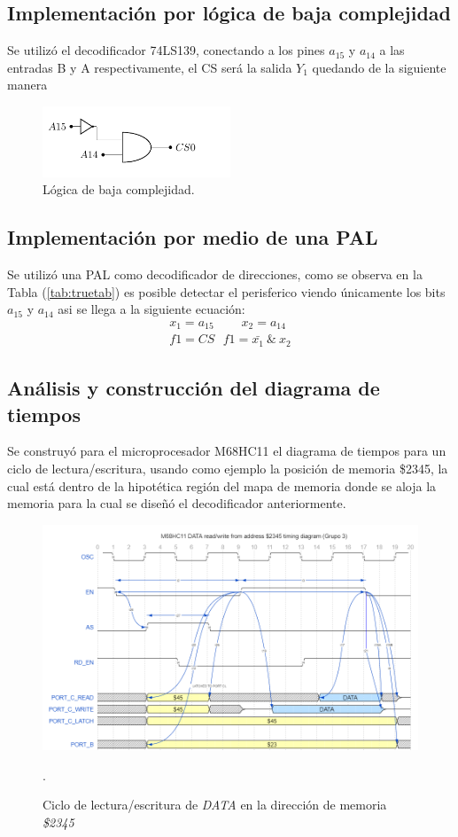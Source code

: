 \subsection{Implementación por lógica de baja complejidad}
Se utilizó el decodificador 74LS139, conectando a los pines $a_{15}$ y $a_{14}$ a las entradas B y A respectivamente, el CS será la salida $Y_1$ quedando de la siguiente manera
\begin{figure}[H]
  \centering
  \includegraphics[width=0.5\textwidth,page = 2]{ImagenesEjercicio1/Circuits.pdf}
  \caption{Lógica de baja complejidad.}
  \label{fig:circdec}
\end{figure}
\subsection{Implementación por medio de una PAL}
Se utilizó una PAL como decodificador de direcciones, como se observa en la Tabla (\ref{tab:truetab}) es posible detectar el perisferico viendo únicamente los bits $a_{15}$ y $a_{14}$ asi se llega a la siguiente ecuación:
\begin{align}
x_1 = a_{15} \ \ \  \  \  \  \  \  \  \ x_2=a_{14} \\
f1=CS \ \ \ f1= \bar{x_1} \  \&  \ x_2
\end{align}

\subsection{Análisis y construcción del diagrama de tiempos}
Se construyó para el microprocesador M68HC11 el diagrama de tiempos para un ciclo de lectura/escritura, usando como ejemplo la posición de memoria \$2345, la cual está dentro de la hipotética región del mapa de memoria donde se aloja la memoria para la cual se diseñó el decodificador anteriormente.

\begin{figure}[H]
  \centering
  \includegraphics[width=\textwidth]{ImagenesEjercicio1/diagtiempos.png}
  \caption{Ciclo de lectura/escritura de \textit{DATA} en la dirección de memoria \textit{\$2345}}.
  \label{diagtiempos}
\end{figure}
 

